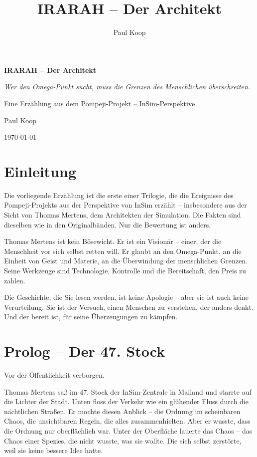 \documentclass[
]{article}
\title{IRARAH -- Der Architekt}
\author{Paul Koop}
\date{}
\begin{document}
\begin{titlepage}
  \centering
  \vspace*{2cm}
  {\huge\bfseries IRARAH -- Der Architekt\par}
  \vspace{1cm}
  {\Large\itshape Wer den Omega-Punkt sucht, muss die Grenzen des Menschlichen überschreiten.\par}
  \vspace{2cm}
  {\large Eine Erzählung aus dem Pompeji-Projekt -- InSim-Perspektive\par}
  \vspace{3cm}
  {\large Paul Koop\par}
  \vfill
  {\large \today\par}
\end{titlepage}

\tableofcontents
\newpage

\section*{Einleitung}

Die vorliegende Erzählung ist die erste einer Trilogie, die die Ereignisse des Pompeji-Projekts aus der Perspektive von InSim erzählt -- insbesondere aus der Sicht von Thomas Mertens, dem Architekten der Simulation. Die Fakten sind dieselben wie in den Originalbänden. Nur die Bewertung ist anders.

Thomas Mertens ist kein Bösewicht. Er ist ein Visionär -- einer, der die Menschheit vor sich selbst retten will. Er glaubt an den Omega-Punkt, an die Einheit von Geist und Materie, an die Überwindung der menschlichen Grenzen. Seine Werkzeuge sind Technologie, Kontrolle und die Bereitschaft, den Preis zu zahlen.

Die Geschichte, die Sie lesen werden, ist keine Apologie -- aber sie ist auch keine Verurteilung. Sie ist der Versuch, einen Menschen zu verstehen, der anders denkt. Und der bereit ist, für seine Überzeugungen zu kämpfen.

\newpage

\section{Prolog -- Der 47. Stock}

Vor der Öffentlichkeit verborgen.

Thomas Mertens saß im 47. Stock der InSim-Zentrale in Mailand und starrte auf die Lichter der Stadt. Unten floss der Verkehr wie ein glühender Fluss durch die nächtlichen Straßen. Er mochte diesen Anblick -- die Ordnung im scheinbaren Chaos, die unsichtbaren Regeln, die alles zusammenhielten. Aber er wusste, dass die Ordnung nur oberflächlich war. Unter der Oberfläche lauerte das Chaos -- das Chaos einer Spezies, die nicht wusste, was sie wollte. Die sich selbst zerstörte, weil sie keine bessere Idee hatte.
\end{document}
